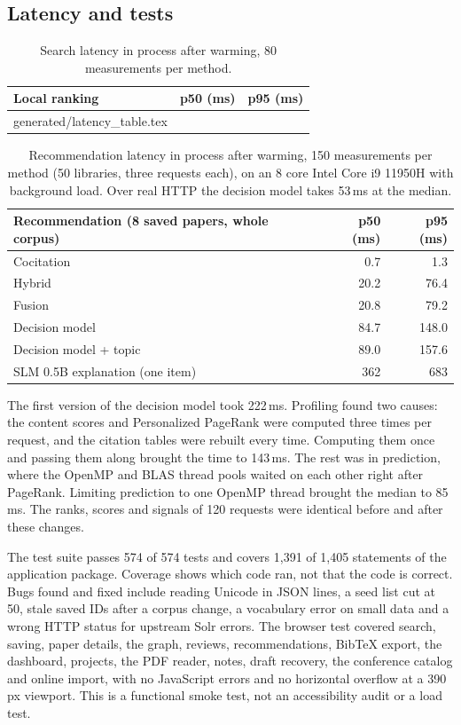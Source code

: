 \documentclass[11pt,a4paper]{article}
\makeatletter
\newcommand{\tableinput}[1]{\@@input#1 }
\makeatother
\begin{document}
\subsection{Latency and tests}
\begin{table}[htbp]\centering
\begin{tabular}{@{}lrr@{}}\toprule
Local ranking & p50 (ms) & p95 (ms)\\\midrule
\tableinput{generated/latency_table.tex}
\bottomrule\end{tabular}\caption{Search latency in process after warming, 80 measurements per method.}\label{tab:latency}\end{table}
\begin{table}[htbp]\centering\small
\begin{tabular}{@{}lrr@{}}\toprule
Recommendation (8 saved papers, whole corpus) & p50 (ms) & p95 (ms)\\\midrule
Cocitation & 0.7 & 1.3\\
Hybrid & 20.2 & 76.4\\
Fusion & 20.8 & 79.2\\
Decision model & 84.7 & 148.0\\
Decision model + topic & 89.0 & 157.6\\
SLM 0.5B explanation (one item) & 362 & 683\\\bottomrule
\end{tabular}\caption{Recommendation latency in process after warming, 150 measurements per method (50 libraries, three requests each), on an 8 core Intel Core i9 11950H with background load. Over real HTTP the decision model takes 53\,ms at the median.}\label{tab:reclatency}\end{table}
The first version of the decision model took 222\,ms. Profiling found two causes: the content scores and Personalized PageRank were computed three times per request, and the citation tables were rebuilt every time. Computing them once and passing them along brought the time to 143\,ms. The rest was in prediction, where the OpenMP and BLAS thread pools waited on each other right after PageRank. Limiting prediction to one OpenMP thread brought the median to 85\,ms. The ranks, scores and signals of 120 requests were identical before and after these changes.

The test suite passes 574 of 574 tests and covers 1,391 of 1,405 statements of the application package. Coverage shows which code ran, not that the code is correct. Bugs found and fixed include reading Unicode in JSON lines, a seed list cut at 50, stale saved IDs after a corpus change, a vocabulary error on small data and a wrong HTTP status for upstream Solr errors. The browser test covered search, saving, paper details, the graph, reviews, recommendations, BibTeX export, the dashboard, projects, the PDF reader, notes, draft recovery, the conference catalog and online import, with no JavaScript errors and no horizontal overflow at a 390\,px viewport. This is a functional smoke test, not an accessibility audit or a load test.
\end{document}
